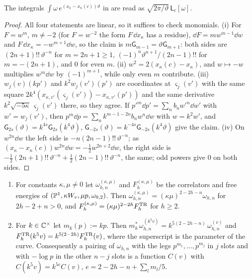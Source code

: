 The integrals $\int\omega\,e^{(x_\kappa-x_\kappa(c))\vartheta}$ in \cite[(2-31), (2-32)]{Dunin-Barkowski:2015caa} are read as $\sqrt{2\pi/\vartheta}\,\mathsf L_c[\omega]$.

\begin{proof}
All four statements are linear, so it suffices to check monomials. (i) For $F=w^m$, $m\neq -2$ (for $F=w^{-2}$ the form $F\,\dd x_\kappa$ has a residue), $\dd F=mw^{m-1}\dd w$ and $F\,\dd x_\kappa=-w^{m+1}\dd w$, so the claim is $m\mathsf G_{m-1}=\vartheta\mathsf G_{m+1}$: both sides are $(2n+1)!!\,\vartheta^{-n}$ for $m=2n+1\geq 1$, $(-1)^n\vartheta^{n+1}/(2n-1)!!$ for $m=-(2n+1)$, and $0$ for even $m$. (ii) $w^2=2(x_\kappa(c)-x_\kappa)$, and $w\mapsto -w$ multiplies $w^m\dd w$ by $(-1)^{m+1}$, while only even $m$ contribute. (iii) $w_j(v)(kp')$ and $k^2w_j(v')(p')$ are coordinates at $\varsigma_j(v')$ with the same square $2k^4(x_{\kappa,v'}(\varsigma_j(v'))-x_{\kappa,v'}(p'))$ and the same derivative $k^2\sqrt{-5\kappa}\,\varsigma_j(v')$ there, so they agree. If $p'^m\dd p'=\sum_nb_nw'^n\dd w'$ with $w'=w_j(v')$, then $p^m\dd p=\sum_nk^{m-1-2n}b_nw^n\dd w$ with $w=k^2w'$, and $\mathsf G_{2s}(\vartheta)=k^{4s}\mathsf G_{2s}(k^4\vartheta)$, $\mathsf G_{-2s}(\vartheta)=k^{-4s}\mathsf G_{-2s}(k^4\vartheta)$ give the claim. (iv) On $w^{2n}\dd w$ the left side is $-n(2n-1)!!\,\vartheta^{-n}$; as $(x_\kappa-x_\kappa(c))w^{2n}\dd w=-\frac12w^{2n+2}\dd w$, the right side is $-\frac12(2n+1)!!\,\vartheta^{-n}+\frac12(2n-1)!!\,\vartheta^{-n}$, the same; odd powers give $0$ on both sides.
\end{proof}

\begin{lem}
\label{lem:mod-scale}
\begin{enumerate}
\item For constants $\kappa,\mu\neq 0$ let $\omega^{(\kappa,\mu)}_{h,n}$ and $F^{(\kappa,\mu)}_h$ be the correlators and free energies of $(\mathbb{P}^1,\kappa W_{v},\mu p,\omega_{0,2})$. Then $\omega^{(\kappa,\mu)}_{h,n}=(\kappa\mu)^{2-2h-n}\omega_{h,n}$ for $2h-2+n>0$, and $F^{(\kappa,\mu)}_h=(\kappa\mu)^{2-2h}F^{\mathrm{TR}}_h$ for $h\geq 2$.
\item For $k\in\mathbb{C}^\times$ let $m_k(p):=kp$. Then $m_k^*\,\omega^{(k^5v)}_{h,n}=k^{5(2-2h-n)}\,\omega^{(v)}_{h,n}$ and $F^{\mathrm{TR}}_h(k^5v)=k^{5(2-2h)}F^{\mathrm{TR}}_h(v)$, where the superscript is the parameter of the curve. Consequently a pairing of $\omega_{h,n}$ with the legs $p^{m_1},\dots,p^{m_j}$ in $j$ slots and with $-\log p$ in the other $n-j$ slots is a function $C(v)$ with $C(k^5v)=k^{5e}C(v)$, $e=2-2h-n+\sum_lm_l/5$.
\end{enumerate}
\end{lem}


